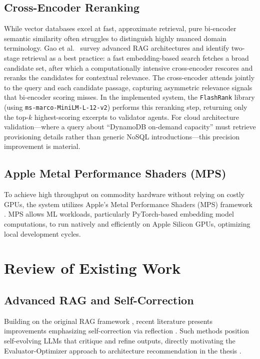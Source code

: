 \subsection{Cross-Encoder Reranking}

While vector databases excel at fast, approximate retrieval, pure bi-encoder semantic similarity often struggles to distinguish highly nuanced domain terminology. Gao et al.~\cite{gao2023retrieval} survey advanced RAG architectures and identify two-stage retrieval as a best practice: a fast embedding-based search fetches a broad candidate set, after which a computationally intensive cross-encoder rescores and reranks the candidates for contextual relevance. The cross-encoder attends jointly to the query and each candidate passage, capturing asymmetric relevance signals that bi-encoder scoring misses. In the implemented system, the \texttt{FlashRank} library (using \texttt{ms-marco-MiniLM-L-12-v2}) performs this reranking step, returning only the top-$k$ highest-scoring excerpts to validator agents. For cloud architecture validation---where a query about ``DynamoDB on-demand capacity'' must retrieve provisioning details rather than generic NoSQL introductions---this precision improvement is material.

\subsection{Apple Metal Performance Shaders (MPS)}

To achieve high throughput on commodity hardware without relying on costly GPUs, the system utilizes Apple’s Metal Performance Shaders (MPS) framework \cite{apple2024mps}. MPS allows ML workloads, particularly PyTorch-based embedding model computations, to run natively and efficiently on Apple Silicon GPUs, optimizing local development cycles.

\section{Review of Existing Work}

\subsection{Advanced RAG and Self-Correction}

Building on the original RAG framework \cite{lewis2020rag}, recent literature presents improvements emphasizing self-correction via reflection \cite{asai2023selfrag}. Such methods position self-evolving LLMs that critique and refine outputs, directly motivating the Evaluator-Optimizer approach to architecture recommendation in the thesis \cite{anthropic2024agents}.

